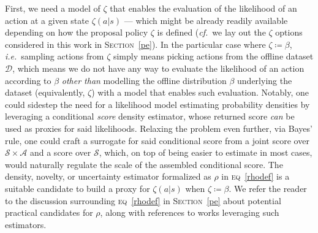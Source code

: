 First, we need a model of $\zeta$ that enables the evaluation of the likelihood of an action
at a given state $\zeta(a | s)$ --- which might be already readily available depending on how the proposal
policy $\zeta$ is defined (\textit{cf.}~we lay out the $\zeta$ options considered in this work
in \textsc{Section}~\ref{pe}).
In the particular case where $\zeta \coloneqq \beta$, \textit{i.e.}~sampling actions from $\zeta$ simply
means picking actions from the offline dataset $\mathcal{D}$, which means we do not have any way to evaluate the
likelihood of an action according to $\beta$ \emph{other than} modelling the offline distribution $\beta$
underlying the dataset (equivalently, $\zeta$) with a model that enables such evaluation.
Notably, one could sidestep the need for a likelihood model estimating probability densities
by leveraging a conditional \textit{score} density estimator,
whose returned score \emph{can} be used as proxies for said likelihoods.
Relaxing the problem even further, via Bayes' rule, one could craft a surrogate for said conditional score
from a joint score over $\mathcal{S} \times \mathcal{A}$ and a score over $\mathcal{S}$, which, on top
of being easier to estimate in most cases, would naturally regulate the scale of the assembled
conditional score. The density, novelty, or uncertainty estimator formalized as $\rho$ in
\textsc{eq}~\ref{rhodef} is a suitable candidate to build a proxy for $\zeta(a | s)$
when $\zeta \coloneqq \beta$.
We refer the reader to the discussion surrounding \textsc{eq}~\ref{rhodef} in \textsc{Section}~\ref{pe}
about potential practical candidates for $\rho$,
along with references to works leveraging such estimators.

